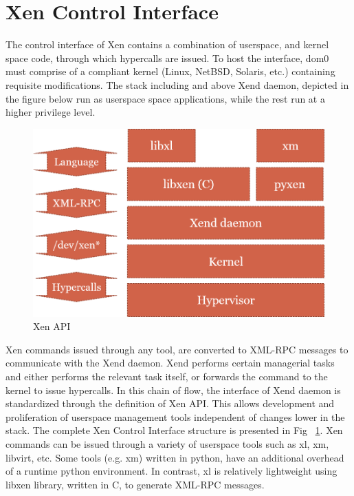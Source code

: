 \section{Xen Control Interface}
The control interface of Xen contains a combination of userspace, and kernel space code, through which hypercalls are issued. To host the interface, dom0 must comprise of a compliant kernel (Linux, NetBSD, Solaris, etc.) containing requisite modifications. The stack including and above Xend daemon, depicted in the figure below run as userspace space applications, while the rest run at a higher privilege level. 


\begin{figure}
\centering
\includegraphics[scale=0.6]{figures/XEN_API.png}
\caption{Xen API}
\label{fig:xen_api}
\end{figure}

Xen commands issued through any tool, are converted to XML-RPC messages to communicate with the Xend daemon. Xend performs certain managerial tasks and either performs the relevant task itself, or forwards the command to the kernel to issue hypercalls. In this chain of flow, the interface of Xend daemon is standardized through the definition of Xen API. This allows development and proliferation of userspace management tools independent of changes lower in the stack. The complete Xen Control Interface structure is presented in Fig ~\ref{fig:xen_api}. Xen commands can be issued through a variety of userspace tools such as xl, xm, libvirt, etc. Some tools (e.g. xm) written in python, have an additional overhead of a runtime python environment. In contrast, xl is relatively lightweight using libxen library, written in C, to generate XML-RPC messages. 

